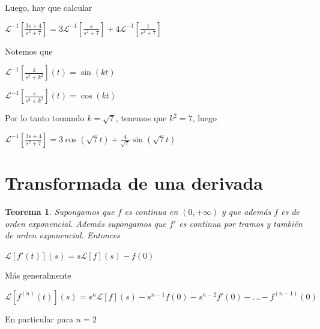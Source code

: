 \documentclass{article}
\theoremstyle{plain}
\newtheorem{thm}{Teorema}[section]
\theoremstyle{definition}
\begin{document}
Luego, hay que calcular



\begin{center}
$\displaystyle \mathcal{L}^{-1}\left[ \frac{3s+4}{s^2+7} \right] = 3\displaystyle \mathcal{L}^{-1}\left[ \frac{s}{s^2+7} \right] + 4\displaystyle \mathcal{L}^{-1}\left[ \frac{1}{s^2+7} \right] $
\end{center}

Notemos que

\begin{center}
$\displaystyle \mathcal{L}^{-1}\left[ \frac{k}{s^2+k^2} \right] (t) = \sin(kt)$
\end{center}



\begin{center}
$\displaystyle \mathcal{L}^{-1}\left[ \frac{s}{s^2+k^2} \right] (t) = \cos(kt)$
\end{center}

Por lo tanto tomando $k = \sqrt{7}$, tenemos que $k^2=7$, luego




\begin{center}
$\displaystyle \mathcal{L}^{-1}\left[ \frac{3s+4}{s^2+7} \right] = 3 \cos(\sqrt{7}t) + \frac{4}{\sqrt{7}}\sin(\sqrt{7}t) $
\end{center}


\newpage

\section{Transformada de una derivada}


\begin{thm}Supongamos que $f$ es continua en $(0,+\infty)$ y que además $f$ es de orden exponencial. Además supongamos que $f'$ es continua por tramos y también de orden exponencial. Entonces
\end{thm}


\begin{center}
$\displaystyle \mathcal{L}[f'(t)](s) = s\mathcal{L}[f](s)- f(0)$
\end{center}

Más generalmente

\begin{center}
$\displaystyle \mathcal{L}[f^{(n)}(t)](s) = s^n\mathcal{L}[f](s)- s^{n-1}f(0)-s^{n-2}f'(0) - ... -f^{(n-1)}(0)$
\end{center}

En particular para $n=2$
\end{document}

